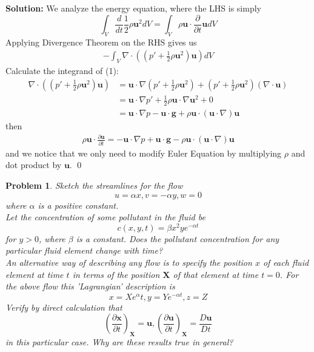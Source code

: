 \documentclass[12pt]{article}
\newtheorem{problem}{Problem}
\begin{document}
\textbf{Solution:} We analyze the energy equation, where the LHS is simply
$$
    \int_{V}\frac{d}{dt}\frac{1}{2}\rho\textbf{u}^2dV=\int_{V}\rho\textbf{u}\cdot\frac{\partial}{\partial t}\textbf{u}dV
$$
Applying Divergence Theorem on the RHS gives us
\begin{align}
    -\int_V\nabla\cdot\left((p'+\frac{1}{2}\rho\textbf{u}^2)\textbf{u}\right)dV
\end{align}
Calculate the integrand of (1):
\begin{align*}
    \nabla\cdot\left((p'+\frac{1}{2}\rho\textbf{u}^2)\textbf{u}\right)&=\textbf{u}\cdot\nabla(p'+\frac{1}{2}\rho\textbf{u}^2)+(p'+\frac{1}{2}\rho\textbf{u}^2)(\nabla\cdot\textbf{u}) \\
    &=\textbf{u}\cdot \nabla p'+\frac{1}{2}\rho\textbf{u}\cdot\nabla\textbf{u}^2+0 \\
    &=\textbf{u}\cdot\nabla p-\textbf{u}\cdot\textbf{g}+\rho\textbf{u}\cdot(\textbf{u}\cdot\nabla)\textbf{u}
\end{align*} then 
\begin{align*}
    \rho\textbf{u}\cdot\frac{\partial\textbf{u}}{\partial t}=-\textbf{u}\cdot\nabla p + \textbf{u}\cdot\textbf{g} - \rho\textbf{u}\cdot(\textbf{u}\cdot\nabla)\textbf{u}
\end{align*} and we notice that we only need to modify Euler Equation by multiplying $\rho$ and dot product by $\textbf{u}$. \qed
\\
\begin{problem}
    Sketch the streamlines for the flow 
    $$
        u=\alpha x, v=-\alpha y, w=0
    $$
    where $\alpha$ is a positive constant. \\
    \indent Let the concentration of some pollutant in the fluid be 
    $$
        c(x,y,t)=\beta x^2ye^{-\alpha t}
    $$ for $y>0$, where $\beta$ is a constant. Does the pollutant concentration for any particular fluid element change with time? \\
    \indent An alternative way of describing any flow is to specify the position $x$ of each fluid element at time $t$ in terms of the position $\textbf{X}$ of that element at time $t=0$. For the above flow this 'Lagrangian' description is 
    $$
        x=Xe^\alpha t, y=Ye^{-\alpha t}, z=Z
    $$
    Verify by direct calculation that 
    $$
        \left(\frac{\partial \textbf{x}}{\partial t}\right)_{\textbf{X}}=\textbf{u}, \left(\frac{\partial\textbf{u}}{\partial t}\right)_{\textbf{X}}=\frac{D\textbf{u}}{Dt}
    $$ in this particular case. Why are these results true in general?
\end{problem}
\end{document}
